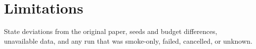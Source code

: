 \section{Limitations}
\label{sec:limitations}
State deviations from the original paper, seeds and budget differences, unavailable data, and any
run that was smoke-only, failed, cancelled, or unknown.
